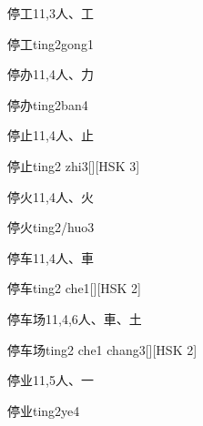 \begin{Entry}{停工}{11,3}{⼈、⼯}
  \begin{Phonetics}{停工}{ting2gong1}
  \end{Phonetics}
\end{Entry}

\begin{Entry}{停办}{11,4}{⼈、⼒}
  \begin{Phonetics}{停办}{ting2ban4}
  \end{Phonetics}
\end{Entry}

\begin{Entry}{停止}{11,4}{⼈、⽌}
  \begin{Phonetics}{停止}{ting2 zhi3}[][HSK 3]
  \end{Phonetics}
\end{Entry}

\begin{Entry}{停火}{11,4}{⼈、⽕}
  \begin{Phonetics}{停火}{ting2/huo3}
  \end{Phonetics}
\end{Entry}

\begin{Entry}{停车}{11,4}{⼈、⾞}
  \begin{Phonetics}{停车}{ting2 che1}[][HSK 2]
  \end{Phonetics}
\end{Entry}

\begin{Entry}{停车场}{11,4,6}{⼈、⾞、⼟}
  \begin{Phonetics}{停车场}{ting2 che1 chang3}[][HSK 2]
  \end{Phonetics}
\end{Entry}

\begin{Entry}{停业}{11,5}{⼈、⼀}
  \begin{Phonetics}{停业}{ting2ye4}
  \end{Phonetics}
\end{Entry}

